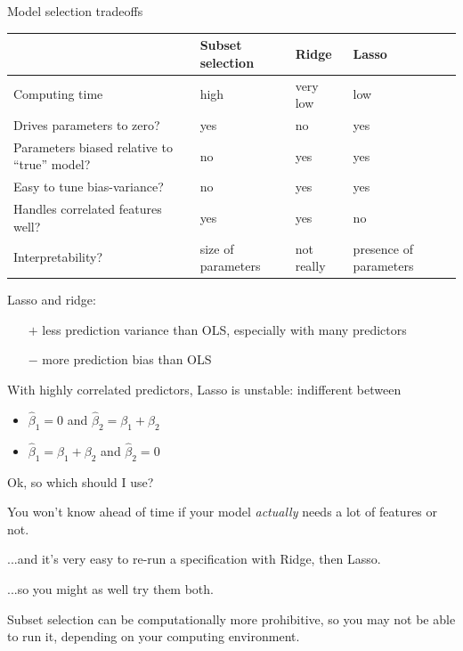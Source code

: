 \documentclass[mathserif, aspectratio=169]{beamer}
\begin{document}
\begin{frame}{Model selection tradeoffs}
\begin{table}[]
\begin{tabular}{p{6cm}p{2.2cm}p{2.2cm}p{2.2cm}}
\hline
                                              & Subset selection & Ridge    & Lasso \\ \hline
Computing time             \pause                   & high             & very low & low   \\
Drives parameters to zero?      \pause              & yes              & no       & yes   \\
Parameters biased relative to ``true'' model? \pause & no               & yes      & yes   \\
Easy to tune bias-variance?          \pause         & no               & yes      & yes   \\
Handles correlated features well?     \pause        & yes              & yes      & no    \\
Interpretability?	  \pause    & size of parameters & not really  & presence of parameters\\
 \hline
\end{tabular}
\end{table}

Lasso and ridge: 
\begin{itemize}
\item[$+$] less prediction variance than OLS, especially with many  predictors 
\item[$-$] more prediction bias than OLS
\end{itemize}
With highly correlated predictors, Lasso is unstable: indifferent between 
\begin{itemize}
\item $\hat{\beta}_1=0$ and $\hat{\beta}_2= \beta_1+\beta_2$
\item $\hat{\beta}_1= \beta_1+\beta_2$ and $\hat{\beta}_2=0$
\end{itemize}
\end{frame}

\begin{frame}{Ok, so which should I use?}

You won't know ahead of time if your model \textit{actually} needs a lot of features or not.  

\vspace{5mm}

...and it's very easy to re-run a specification with Ridge, then Lasso.

\vspace{5mm}

...so you might as well try them both.

\vspace{5mm}

Subset selection can be computationally more prohibitive, so you may not be able to run it, depending on your computing environment.

\end{frame}
\end{document}
